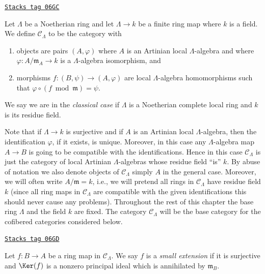 \begin{definition}[CLambda]
\label{formal-defos-definition-CLambda}
\href{https://stacks.math.columbia.edu/tag/06GC}{\texttt{Stacks tag 06GC}}

Let $\Lambda$ be a Noetherian ring and let $\Lambda \to k$ be a finite
ring map where $k$ is a field. We define {\it $\mathcal{C}_\Lambda$} to be
the category with
\begin{enumerate}
\item objects are pairs $(A, \varphi)$ where $A$ is an Artinian local
$\Lambda$-algebra and where $\varphi : A/\mathfrak m_A \to k$ is a
$\Lambda$-algebra isomorphism, and
\item morphisms $f : (B, \psi) \to (A, \varphi)$ are local $\Lambda$-algebra
homomorphisms such that $\varphi \circ (f \bmod \mathfrak m) = \psi$.
\end{enumerate}
We say we are in the {\it classical case} if $\Lambda$ is a Noetherian
complete local ring and $k$ is its residue field.
\end{definition}

Note that if $\Lambda \to k$ is surjective and if $A$ is an Artinian local
$\Lambda$-algebra, then the identification $\varphi$, if it exists,
is unique. Moreover, in this case any $\Lambda$-algebra map $A \to B$ is
going to be compatible with the identifications. Hence in this case
$\mathcal{C}_\Lambda$ is just the category of local Artinian $\Lambda$-algebras
whose residue field ``is'' $k$. By abuse of notation we also denote objects of
$\mathcal{C}_\Lambda$ simply $A$ in the general case. Moreover, we will
often write $A/\mathfrak m = k$, i.e., we will pretend all rings in
$\mathcal{C}_\Lambda$ have residue field $k$ (since all ring maps in
$\mathcal{C}_\Lambda$ are compatible with the given identifications this
should never cause any problems).
Throughout the rest of this chapter the base ring $\Lambda$ and the
field $k$ are fixed. The category $\mathcal{C}_\Lambda$ will be the base
category for the cofibered categories considered below.

\begin{definition}
\label{formal-defos-definition-small-extension}
\href{https://stacks.math.columbia.edu/tag/06GD}{\texttt{Stacks tag 06GD}}

Let $f: B \to A$ be a ring map in $\mathcal{C}_\Lambda$.  We say $f$
is a {\it small extension} if it is surjective and $\Ker(f)$ is a nonzero
principal ideal which is annihilated by $\mathfrak{m}_B$.
\end{definition}

